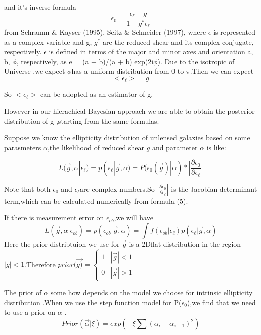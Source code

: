\documentclass[useAMS,usenatbib]{mn2e}
\begin{document}
and it's inverse formula 
\begin{equation}
\epsilon_{0}=\frac{\epsilon_{\ell}-g}{1-g^{*}\epsilon_{\ell}}
\end{equation}
from Schramm \& Kayser (1995), Seitz \& Schneider (1997), where $\epsilon$
is represented as a complex variable and g, $g^{*}$ are the reduced
shear and its complex conjugate, respectively. $\epsilon$ is defined
in terms of the major and minor axes and orientation a, b, $\phi$,
respectively, as e = (a − b)/(a + b) exp(2i$\phi$). Due to the isotropic
of Universe ,we expect $\phi$has a uniform distribution from 0 to
$\pi$.Then we can expect 
\begin{equation}
<\epsilon_{\ell}>=g
\end{equation}


So $<\epsilon_{\ell}>$ can be adopted as an estimator of g.

However in our hierachical Bayesian approach we are able to obtain
the posterior distribution of g ,starting from the same formulas.

Suppose we know the ellipticity distribution of unlensed galaxies
based on some parasmeters $\alpha$,the likelihood of reduced shear
$g$ and parameter $\alpha$ is like:

\begin{equation}
L(\vec{g},\alpha|\epsilon_{\ell})=p(\epsilon_{\ell}|\vec{g},\alpha)=P(\epsilon_{0}(\vec{g})|\alpha)*|\frac{\partial\epsilon_{0}}{\partial\epsilon_{\ell}}|
\end{equation}


Note that both $\epsilon_{0}$ and $\epsilon_{\ell}$are complex numbers.So
$|\frac{\partial\epsilon_{0}}{\partial\epsilon_{\ell}}|$ is the Jacobian
determinant term,which can be calculated numerically from formula
(5).

If there is measurement error on $\epsilon_{ob}$,we will have 
\begin{equation}
L(\vec{g},\alpha|\epsilon_{ob})=p(\epsilon_{ob}|\vec{g},\alpha)=\int f(\epsilon_{ob}|\epsilon_{\ell})p(\epsilon_{\ell}|\vec{g},\alpha)
\end{equation}
Here the prior distribtuion we use for $\vec{g}$ is a 2Dflat distribution
in the region $|g|<1$.Therefore $prior(\vec{g)}=\begin{cases}
1 & |\vec{g}|<1\\
0 & |\vec{g}|>1
\end{cases}$

The prior of $\alpha$ some how depends on the model we choose for
intrinsic ellipticity distribution .When we use the step function
model for P($\epsilon_{0}$),we find that we need to use a prior on
$\alpha$ .
\begin{equation}
Prior(\vec{\alpha}|\xi)=exp(-\xi\sum(\alpha_{i}-\alpha_{i-1})^{2})
\end{equation}
\end{document}
